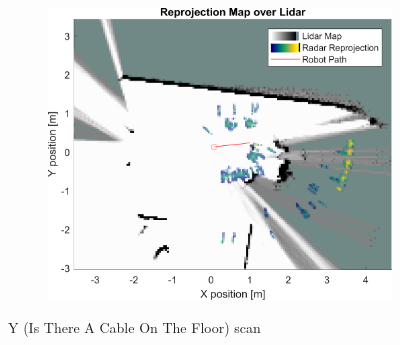 \begin{figure}[htbp]
\begin{subfigure}[t]{0.475\linewidth}
        \includegraphics[width=\linewidth,max height=.475\textheight]{gfx/results/y_map.png}
    \end{subfigure}%
    \caption{Y (Is There A Cable On The Floor) scan}
\end{figure}




